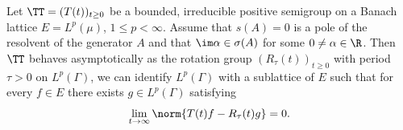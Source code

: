 \begin{theorem}\label{thm:c4-2.14}
%
%
%
Let $\TT = (T(t))_{t \geq 0}$ be a bounded, irreducible positive semigroup on a Banach lattice $E = L^{p}(\mu)$, $1 \leq p < \infty$.
Assume that $s(A) = 0$ is a pole of the resolvent of the generator $A$ and that $\im\alpha \in \sigma(A)$ for some $0 \neq \alpha \in \R$.
Then $\TT$ behaves asymptotically as the rotation group $(R_{\tau}(t))_{t \geq 0}$ with period $\tau > 0$ on $L^{p}(\Gamma)$, \ie  we can identify $L^{p}(\Gamma)$ with a sublattice of\/ $E$ such that for every $f \in E$ there exists $g \in L^{p}(\Gamma)$ satisfying
\begin{equation}\label{eq:c4-2.12}
\lim_{t \to \infty} \norm{T(t)f - R_{\tau}(t)g} = 0.
\end{equation}
\end{theorem}
